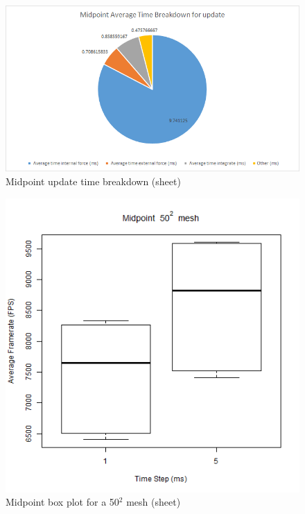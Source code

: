     \begin{figure}
    \begin{center}
      \includegraphics[scale=.9]{Figures/sheet_m_ut}
    \end{center}
    \caption{Midpoint update time breakdown (sheet)}
    \label{fig:m ut sheet}
  \end{figure}

    \begin{figure}
    \begin{center}
      \includegraphics[scale=.9]{Figures/sheet_m_50_box}
    \end{center}
    \caption{Midpoint box plot for a 50$^{2}$ mesh (sheet)}
    \label{fig:m box 50 sheet}
  \end{figure}
  
